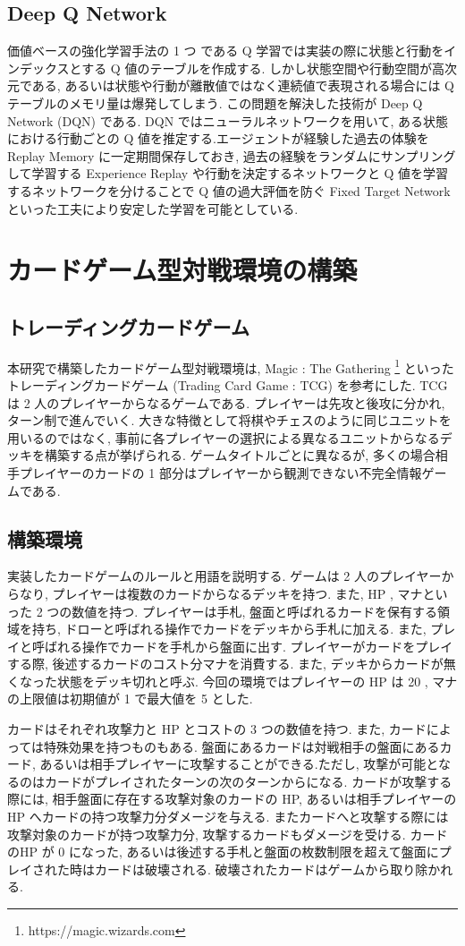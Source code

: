 \documentclass[twocolumn]{jarticle}
\begin{document}
\subsection{Deep Q Network}
価値ベースの強化学習手法の 1 つ である Q 学習では実装の際に状態と行動をインデックスとする Q 値のテーブルを作成する. しかし状態空間や行動空間が高次元である, あるいは状態や行動が離散値ではなく連続値で表現される場合には Q テーブルのメモリ量は爆発してしまう. この問題を解決した技術が Deep Q Network (DQN) \cite{mnih2013atari} である.
 DQN ではニューラルネットワークを用いて, ある状態における行動ごとの Q 値を推定する.エージェントが経験した過去の体験を Replay Memory に一定期間保存しておき, 過去の経験をランダムにサンプリングして学習する Experience Replay や行動を決定するネットワークと Q 値を学習するネットワークを分けることで Q 値の過大評価を防ぐ Fixed Target Network といった工夫により安定した学習を可能としている.

\section{カードゲーム型対戦環境の構築}
\subsection{トレーディングカードゲーム}
本研究で構築したカードゲーム型対戦環境は, Magic : The Gathering \footnote[1]{https://magic.wizards.com} といったトレーディングカードゲーム (Trading Card Game : TCG) を参考にした. TCG は 2 人のプレイヤーからなるゲームである. プレイヤーは先攻と後攻に分かれ, ターン制で進んでいく. 大きな特徴として将棋やチェスのように同じユニットを用いるのではなく, 事前に各プレイヤーの選択による異なるユニットからなるデッキを構築する点が挙げられる. 
ゲームタイトルごとに異なるが, 多くの場合相手プレイヤーのカードの 1 部分はプレイヤーから観測できない不完全情報ゲームである.

\subsection{構築環境}
実装したカードゲームのルールと用語を説明する.
ゲームは 2 人のプレイヤーからなり, プレイヤーは複数のカードからなるデッキを持つ. また, HP , マナといった 2 つの数値を持つ. 
プレイヤーは手札, 盤面と呼ばれるカードを保有する領域を持ち, ドローと呼ばれる操作でカードをデッキから手札に加える. また, プレイと呼ばれる操作でカードを手札から盤面に出す. プレイヤーがカードをプレイする際, 後述するカードのコスト分マナを消費する. また, デッキからカードが無くなった状態をデッキ切れと呼ぶ.  
今回の環境ではプレイヤーの HP は 20 , マナの上限値は初期値が 1 で最大値を 5 とした.
\par
カードはそれぞれ攻撃力と HP とコストの 3 つの数値を持つ. また, カードによっては特殊効果を持つものもある. 盤面にあるカードは対戦相手の盤面にあるカード, あるいは相手プレイヤーに攻撃することができる.ただし, 攻撃が可能となるのはカードがプレイされたターンの次のターンからになる. カードが攻撃する際には, 相手盤面に存在する攻撃対象のカードの HP, あるいは相手プレイヤーの HP へカードの持つ攻撃力分ダメージを与える. またカードへと攻撃する際には攻撃対象のカードが持つ攻撃力分, 攻撃するカードもダメージを受ける.
カードのHP が 0 になった, あるいは後述する手札と盤面の枚数制限を超えて盤面にプレイされた時はカードは破壊される. 破壊されたカードはゲームから取り除かれる.
\end{document}
